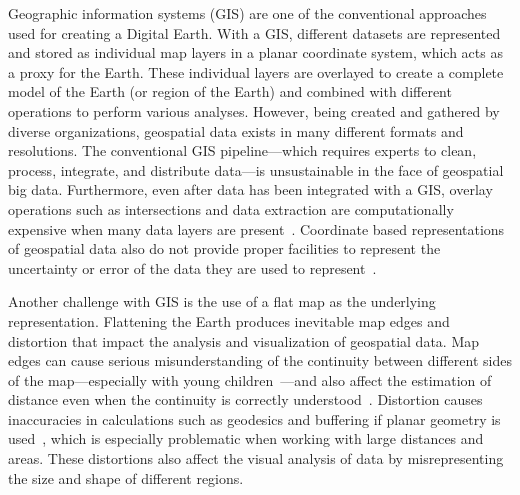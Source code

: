 Geographic information systems (GIS) are one of the conventional approaches used for creating a Digital Earth.
With a GIS, different datasets are represented and stored as individual map layers in a planar coordinate system, which acts as a proxy for the Earth.
These individual layers are overlayed to create a complete model of the Earth (or region of the Earth) and combined with different operations to perform various analyses.
However, being created and gathered by diverse organizations, geospatial data exists in many different formats and resolutions.
The conventional GIS pipeline---which requires experts to clean, process, integrate, and distribute data---is unsustainable in the face of geospatial big data.
Furthermore, even after data has been integrated with a GIS, overlay operations such as intersections and data extraction are computationally expensive when many data layers are present~\cite{wang2015improving}.
Coordinate based representations of geospatial data also do not provide proper facilities to represent the uncertainty or error of the data they are used to represent~\cite{goodchild2018reimagining}.


Another challenge with GIS is the use of a flat map as the underlying representation.
Flattening the Earth produces inevitable map edges and distortion that impact the analysis and visualization of geospatial data.
Map edges can cause serious misunderstanding of the continuity between different sides of the map---especially with young children~\cite{hennerdal2015beyond}---and also affect the estimation of distance even when the continuity is correctly understood~\cite{hruby2016journey}.
Distortion causes inaccuracies in calculations such as geodesics and buffering if planar geometry is used~\cite{flaterbuffering}, which is especially problematic when working with large distances and areas.
These distortions also affect the visual analysis of data by misrepresenting the size and shape of different regions.


